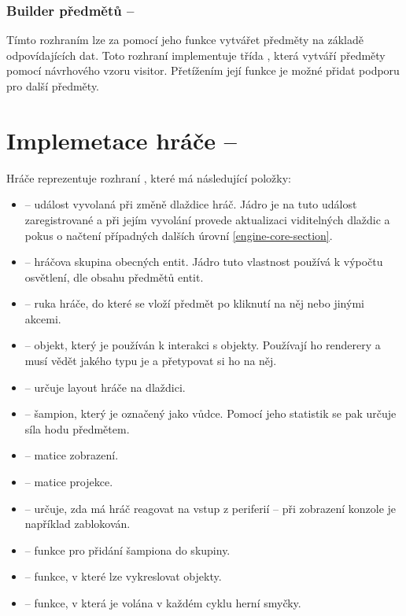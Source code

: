 \subsubsection{Builder předmětů -- }
Tímto rozhraním lze za pomocí jeho funkce  vytvářet předměty na základě odpovídajících dat. Toto rozhraní implementuje třída
, která vytváří předměty pomocí návrhového vzoru visitor. Přetížením její funkce  je možné přidat podporu
pro další předměty.


\section{Implemetace hráče -- }
Hráče reprezentuje rozhraní , které má následující položky:
\begin{itemize}
\item {} -- událost vyvolaná při změně dlaždice hráč. Jádro je na tuto událost zaregistrované a při jejím vyvolání provede aktualizaci
	viditelných dlaždic a pokus o načtení případných dalších úrovní \vref{engine-core-section}.
\item {} -- hráčova skupina obecných entit. Jádro tuto vlastnost používá k výpočtu osvětlení, dle obsahu předmětů entit.
\item {} -- ruka hráče, do které se vloží předmět po kliknutí na něj nebo jinými akcemi.
\item {} -- objekt, který je používán k interakci s objekty. Používají ho renderery a musí vědět jakého typu je a přetypovat si ho na něj.
\item {} -- určuje layout hráče na dlaždici.
\item {} -- šampion, který je označený jako vůdce. Pomocí jeho statistik se pak určuje síla hodu předmětem.
\item {} -- matice zobrazení.
\item {} -- matice projekce.
\item {} -- určuje, zda má hráč reagovat na vstup z periferií -- při zobrazení konzole je například zablokován.
\item {} -- funkce pro přidání šampiona do skupiny.
\item {} -- funkce, v které lze vykreslovat objekty.
\item {} -- funkce, v která je volána v každém cyklu herní smyčky.
\end{itemize}

